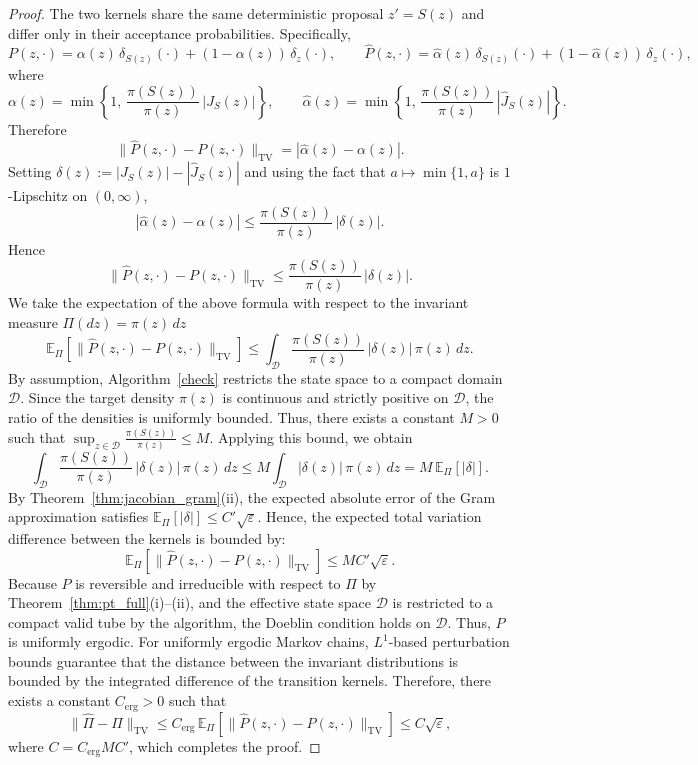 \documentclass[12pt]{article}
\begin{document}
\begin{proof}
The two kernels share the same deterministic proposal $z' = S(z)$ and differ 
only in their acceptance probabilities. Specifically,
\[
P(z,\cdot) 
= \alpha(z)\,\delta_{S(z)}(\cdot) + (1-\alpha(z))\,\delta_z(\cdot), \qquad
\widehat{P}(z,\cdot) 
= \widehat{\alpha}(z)\,\delta_{S(z)}(\cdot) + (1-\widehat{\alpha}(z))\,\delta_z(\cdot),
\]
where
\[
\alpha(z) 
= \min\!\left\{1,\,\frac{\pi(S(z))}{\pi(z)}\,|J_S(z)|\right\}, 
\qquad 
\widehat{\alpha}(z) 
= \min\!\left\{1,\,\frac{\pi(S(z))}{\pi(z)}\,|\widehat{J}_S(z)|\right\}.
\]
Therefore
\[
\|\widehat{P}(z,\cdot) - P(z,\cdot)\|_{\mathrm{TV}}
= |\widehat{\alpha}(z) - \alpha(z)|.
\]
Setting $\delta(z) := |J_S(z)| - |\widehat{J}_S(z)|$ and using the fact that 
$a \mapsto \min\{1,a\}$ is $1$-Lipschitz on $(0,\infty)$,
\[
|\widehat{\alpha}(z) - \alpha(z)|
\le 
\frac{\pi(S(z))}{\pi(z)}\,|\delta(z)|.
\]
Hence
\[
\|\widehat{P}(z,\cdot) - P(z,\cdot)\|_{\mathrm{TV}}
\le 
\frac{\pi(S(z))}{\pi(z)}\,|\delta(z)|. 
\]
We take the expectation of the above formula with respect to the invariant measure $\Pi(dz) = \pi(z)\,dz$
\[
\mathbb{E}_{\Pi}
\!\left[
\|\widehat{P}(z,\cdot) - P(z,\cdot)\|_{\mathrm{TV}}
\right]
\le 
\int_{\mathcal{D}} 
\frac{\pi(S(z))}{\pi(z)}\,|\delta(z)|\,\pi(z)\,dz.
\]
By assumption, Algorithm~\ref{check} restricts the state space to a compact domain $\mathcal{D}$. Since the target density $\pi(z)$ is continuous and strictly positive on $\mathcal{D}$, the ratio of the densities is uniformly bounded. Thus, there exists a constant $M > 0$ such that $\sup_{z \in \mathcal{D}} \frac{\pi(S(z))}{\pi(z)} \le M$. 
Applying this bound, we obtain
\[
\int_{\mathcal{D}} \frac{\pi(S(z))}{\pi(z)}\,|\delta(z)|\,\pi(z)\,dz 
\le 
M \int_{\mathcal{D}} |\delta(z)|\,\pi(z)\,dz 
= M\,\mathbb{E}_{\Pi}[|\delta|].
\]
By Theorem~\ref{thm:jacobian_gram}(ii), the expected absolute error of the Gram approximation satisfies $\mathbb{E}_{\Pi}[|\delta|] \le C' \sqrt{\varepsilon}$. Hence, the expected total variation difference between the kernels is bounded by:
\[
\mathbb{E}_{\Pi}
\!\left[
\|\widehat{P}(z,\cdot) - P(z,\cdot)\|_{\mathrm{TV}}
\right]
\le 
M C' \sqrt{\varepsilon}.
\]
Because $P$ is reversible and irreducible with respect to $\Pi$ by Theorem~\ref{thm:pt_full}(i)--(ii), and the effective state space $\mathcal{D}$ is restricted to a compact valid tube by the algorithm, the Doeblin condition holds on $\mathcal{D}$. Thus, $P$ is uniformly ergodic. 
For uniformly ergodic Markov chains, $L^1$-based perturbation bounds \citep{J30} guarantee that the distance between the invariant distributions is bounded by the integrated difference of the transition kernels. Therefore, there exists a constant $C_{\mathrm{erg}} > 0$ such that
\[
\|\widehat{\Pi} - \Pi\|_{\mathrm{TV}}
\le C_{\mathrm{erg}}\, \mathbb{E}_{\Pi}\!\left[ \|\widehat{P}(z,\cdot) - P(z,\cdot)\|_{\mathrm{TV}} \right]
\le C \sqrt{\varepsilon},
\]
where $C = C_{\mathrm{erg}} M C'$, which completes the proof.
\end{proof}
\end{document}
